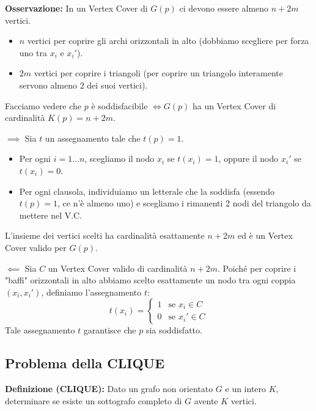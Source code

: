 \textbf{Osservazione:} In un Vertex Cover di $G(p)$ ci devono essere almeno $n + 2m$ vertici. 
\begin{itemize}
    \item $n$ vertici per coprire gli archi orizzontali in alto (dobbiamo scegliere per forza uno tra $x_i$ e $x_i'$).
    \item $2m$ vertici per coprire i triangoli (per coprire un triangolo interamente servono almeno 2 dei suoi vertici).
\end{itemize}

Facciamo vedere che $p$ è soddisfacibile $\iff G(p)$ ha un Vertex Cover di cardinalità $K(p) = n + 2m$.

$\implies$ Sia $t$ un assegnamento tale che $t(p) = 1$.
\begin{itemize}
    \item Per ogni $i=1 \dots n$, scegliamo il nodo $x_i$ se $t(x_i) = 1$, oppure il nodo $x_i'$ se $t(x_i) = 0$.
    \item Per ogni clausola, individuiamo un letterale che la soddisfa (essendo $t(p)=1$, ce n'è almeno uno) e scegliamo i rimanenti 2 nodi del triangolo da mettere nel V.C.
\end{itemize}
L'insieme dei vertici scelti ha cardinalità esattamente $n + 2m$ ed è un Vertex Cover valido per $G(p)$.

$\impliedby$ Sia $C$ un Vertex Cover valido di cardinalità $n+2m$. 
Poiché per coprire i "baffi" orizzontali in alto abbiamo scelto esattamente un nodo tra ogni coppia $(x_i, x_i')$, definiamo l'assegnamento $t$:
$$ 
t(x_i) = 
\begin{cases} 
1 & \text{se } x_i \in C \\ 
0 & \text{se } x_i' \in C 
\end{cases} 
$$
Tale assegnamento $t$ garantisce che $p$ sia soddisfatto.













\vspace{0.4cm}
\subsection{Problema della CLIQUE}

\textbf{Definizione (CLIQUE):} Dato un grafo non orientato $G$ e un intero $K$, determinare se esiste un sottografo completo di $G$ avente $K$ vertici.


